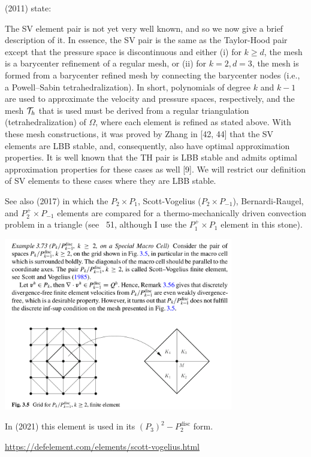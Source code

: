 \textcite{cael11} (2011) state:
\begin{displayquote}
{\color{darkgray}
The SV element pair is not yet very well known,
and so we now give a brief description of it. In essence, the SV pair is the same as
the Taylor-Hood pair except that the pressure space is discontinuous and either
(i) for $k \ge d$, the mesh is a barycenter reﬁnement of a regular mesh, or
(ii) for $k = 2, d = 3$, the mesh is formed from a barycenter reﬁned mesh by
connecting the barycenter nodes (i.e., a Powell–Sabin tetrahedralization).
In short, polynomials of degree $k$ and $k-1$ are used to approximate the velocity
and pressure spaces, respectively, and the mesh ${\cal T}_h$ that is used must be derived from
a regular triangulation (tetrahedralization) of $\Omega$, where each element is reﬁned as
stated above. With these mesh constructions, it was proved by Zhang in [42, 44] that
the SV elements are LBB stable, and, consequently, also have optimal approximation
properties. It is well known that the TH pair is LBB stable and admits optimal
approximation properties for these cases as well [9]. We will restrict our deﬁnition of
SV elements to these cases where they are LBB stable.
}
\end{displayquote}



See also \textcite{jolm17} (2017) in which the $P_2\times P_1$, Scott-Vogelius ($P_2\times P_{-1}$), 
Bernardi-Raugel, and $P_2^+\times P_{-1}$ elements 
are compared for a thermo-mechanically driven convection problem in a triangle (see \stone~51, 
although I use the $P_1^+\times P_1$ element in this stone).


\begin{center}
\includegraphics[width=10cm]{images/pair_scott_vogelius/john_scott_vogelius}\\
\end{center}


In \textcite{befh21} (2021) this element is used in its $(P_3)^2-P_2^{\text{disc}}$ form.

\begin{center}
\url{https://defelement.com/elements/scott-vogelius.html}
\end{center}

